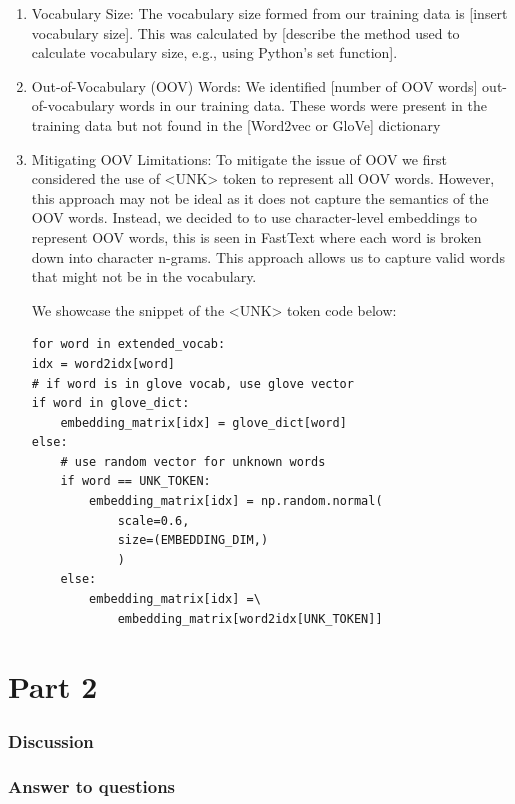 \documentclass{article}
\begin{document}
\begin{enumerate}
  \item Vocabulary Size: The vocabulary size formed from our training data is [insert
            vocabulary size]. This was calculated by [describe the method used to calculate
            vocabulary size, e.g., using Python's set function].

  \item Out-of-Vocabulary (OOV) Words: We identified [number of OOV words]
        out-of-vocabulary words in our training data. These words were present in the
        training data but not found in the [Word2vec or GloVe] dictionary

  \item Mitigating OOV Limitations: To mitigate the issue of OOV we first considered
        the use of <UNK> token to represent all OOV words. However, this approach may
        not be ideal as it does not capture the semantics of the OOV words. Instead, we
        decided to to use character-level embeddings to represent OOV words, this is
        seen in FastText where each word is broken down into character n-grams. This
        approach allows us to capture valid words that might not be in the vocabulary.

        We showcase the snippet of the <UNK> token code below:

\begin{verbatim}
for word in extended_vocab:
idx = word2idx[word]
# if word is in glove vocab, use glove vector
if word in glove_dict:
    embedding_matrix[idx] = glove_dict[word]
else:
    # use random vector for unknown words
    if word == UNK_TOKEN:
        embedding_matrix[idx] = np.random.normal(
            scale=0.6,
            size=(EMBEDDING_DIM,)
            )
    else:
        embedding_matrix[idx] =\
            embedding_matrix[word2idx[UNK_TOKEN]]
\end{verbatim}

\end{enumerate}

\section*{Part 2}

\subsubsection*{Discussion}

\subsubsection*{Answer to questions}
\end{document}
